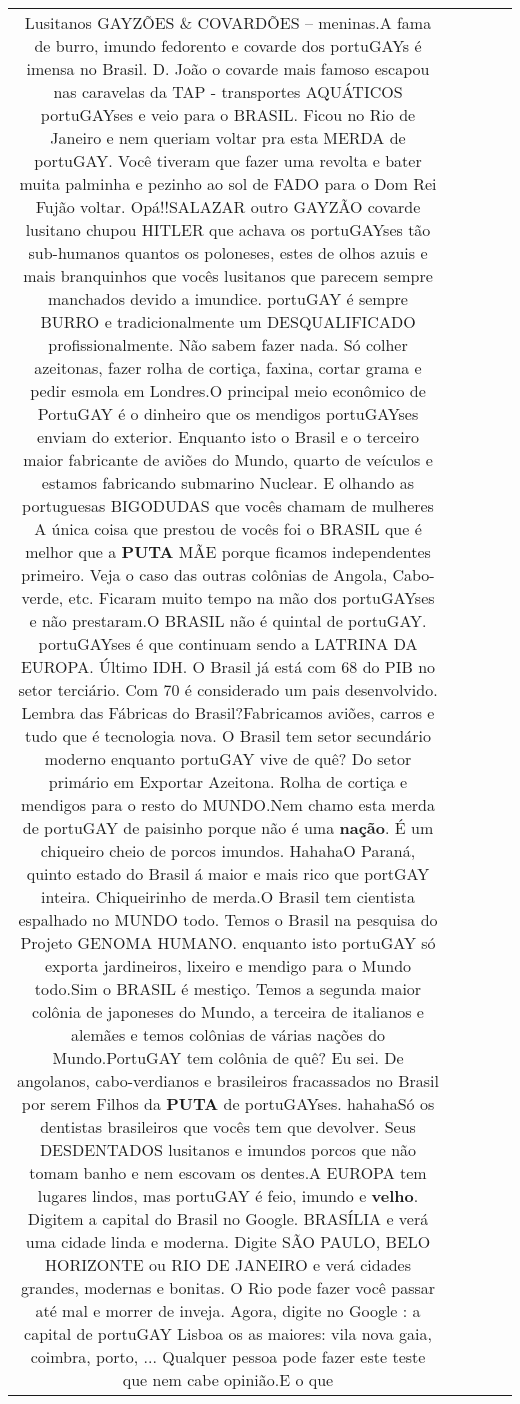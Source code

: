 \documentclass[11pt]{article}
\newlength\mylength
\begin{document}
\begin{center}
\begin{longtable}{|C{.65\mylength}|C{.30\mylength}|C{.12\mylength}|C{.12\mylength}|C{.12\mylength}|}
  \small Lusitanos  GAYZÕES  \& COVARDÕES – meninas.A fama de burro, imundo fedorento e covarde dos portuGAYs é imensa no Brasil. D. João o covarde mais famoso escapou nas caravelas da TAP -  transportes AQUÁTICOS  portuGAYses e veio para o BRASIL.  Ficou no Rio de Janeiro e nem queriam voltar pra esta MERDA de portuGAY. Você tiveram que fazer uma revolta e bater muita palminha e pezinho ao sol de FADO para o Dom Rei Fujão voltar.  Opá!!SALAZAR outro GAYZÃO covarde  lusitano chupou HITLER que achava os portuGAYses tão sub-humanos quantos  os poloneses, estes de olhos azuis e mais branquinhos que vocês lusitanos  que parecem sempre manchados devido a imundice. portuGAY é sempre BURRO e tradicionalmente um DESQUALIFICADO profissionalmente. Não sabem fazer nada.  Só colher azeitonas, fazer rolha de cortiça, faxina, cortar grama e pedir esmola em Londres.O principal meio econômico de PortuGAY é o dinheiro que os mendigos portuGAYses enviam do exterior.  Enquanto isto o Brasil e o terceiro maior fabricante de aviões do Mundo, quarto de veículos e estamos fabricando submarino Nuclear. E olhando  as portuguesas  BIGODUDAS que vocês chamam de mulheres A única coisa que prestou de vocês foi o BRASIL que é melhor que a \textbf{PUTA} MÃE porque ficamos independentes primeiro. Veja o caso das outras colônias de Angola, Cabo-verde, etc. Ficaram muito tempo na mão dos portuGAYses e não prestaram.O  BRASIL não é quintal de portuGAY.  portuGAYses é que continuam sendo a LATRINA DA EUROPA. Último IDH. O Brasil já está com 68 do PIB no setor terciário. Com 70 é considerado um pais desenvolvido. Lembra das Fábricas do Brasil?Fabricamos aviões, carros e tudo que é tecnologia nova. O Brasil tem setor secundário moderno  enquanto portuGAY vive de quê? Do setor primário em Exportar Azeitona. Rolha de cortiça e mendigos para o resto do MUNDO.Nem chamo esta merda de portuGAY de paisinho porque não é uma \textbf{nação}. É um chiqueiro cheio de porcos imundos. HahahaO Paraná, quinto estado do Brasil á maior e mais rico que portGAY inteira. Chiqueirinho de merda.O Brasil tem cientista espalhado no MUNDO todo. Temos o Brasil na pesquisa do Projeto GENOMA HUMANO. enquanto isto portuGAY só exporta jardineiros, lixeiro e mendigo para o Mundo todo.Sim  o BRASIL é mestiço. Temos a segunda maior colônia de japoneses do Mundo, a terceira de italianos e alemães e temos colônias de várias nações do Mundo.PortuGAY tem colônia de quê?  Eu sei. De angolanos, cabo-verdianos e brasileiros fracassados no Brasil por serem  Filhos da \textbf{PUTA} de portuGAYses. hahahaSó os dentistas brasileiros  que vocês tem que devolver. Seus DESDENTADOS lusitanos e imundos porcos que não tomam banho e nem escovam os dentes.A EUROPA tem lugares lindos, mas portuGAY é feio, imundo e \textbf{velho}.  Digitem a capital do Brasil no Google. BRASÍLIA e verá uma cidade linda e moderna. Digite SÃO PAULO, BELO HORIZONTE ou RIO DE JANEIRO e verá cidades grandes, modernas e bonitas. O Rio pode fazer você passar até mal e morrer de inveja. Agora, digite no Google : a capital de portuGAY Lisboa os as maiores: vila nova gaia, coimbra, porto, ... Qualquer pessoa pode fazer este teste que nem cabe opinião.E o que 
\end{longtable}
\end{center}
\end{document}
